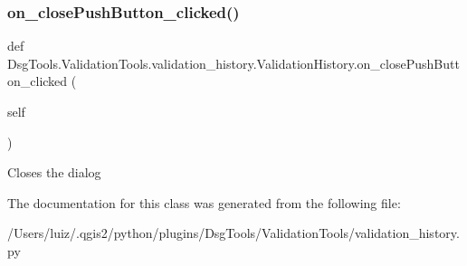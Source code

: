 \subsubsection{\texorpdfstring{on\+\_\+close\+Push\+Button\+\_\+clicked()}{on\_closePushButton\_clicked()}}
{\footnotesize\ttfamily def Dsg\+Tools.\+Validation\+Tools.\+validation\+\_\+history.\+Validation\+History.\+on\+\_\+close\+Push\+Button\+\_\+clicked (\begin{DoxyParamCaption}\item[{}]{self }\end{DoxyParamCaption})}

\begin{DoxyVerb}Closes the dialog
\end{DoxyVerb}
 

The documentation for this class was generated from the following file\+:\begin{DoxyCompactItemize}
\item 
/\+Users/luiz/.\+qgis2/python/plugins/\+Dsg\+Tools/\+Validation\+Tools/validation\+\_\+history.\+py\end{DoxyCompactItemize}
